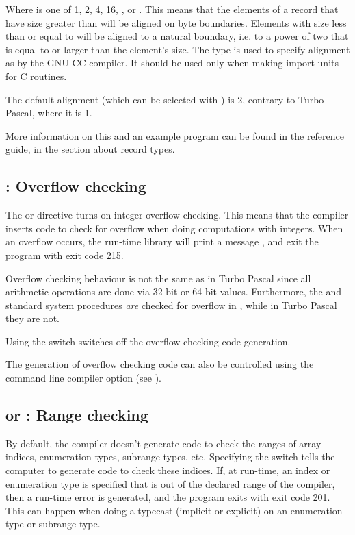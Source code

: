 Where  is one of 1, 2, 4, 16, ,  or .
This means that the elements of a record that have size greater than 
will be aligned on  byte boundaries. Elements with size less than or
equal to  will be aligned to a natural boundary, i.e. to a power of
two that is equal to or larger than the element's size. The type 
is used to specify alignment as by the GNU CC compiler. It should be used
only when making import units for C routines.

The default alignment (which can be selected with ) is 2,
contrary to Turbo Pascal, where it is 1.

More information on this and an example program can be found in the reference
guide, in the section about record types.


\subsection{ : Overflow checking}
The  or  directive turns on
integer overflow checking. This means that the compiler inserts code
to check for overflow when doing computations with integers.
When an overflow occurs, the run-time library will print a message
, and exit the program with exit code 215.

\begin{remark}Overflow checking behaviour is not the same as in
Turbo Pascal since all arithmetic operations are done via 32-bit or
64-bit values. Furthermore, the  and  standard system
procedures {\em are} checked for overflow in \fpc, while in Turbo
Pascal they are not.
\end{remark}
Using the  switch switches off the overflow checking code
generation.

The generation of overflow checking code can also be controlled
using the  command line compiler option (see \userref).

\subsection{ or  : Range checking}

By default, the compiler doesn't generate code to check the ranges of array
indices, enumeration types, subrange types, etc. Specifying the
 switch tells the computer to generate code to check these
indices. If, at run-time, an index or enumeration type is specified that is
out of the declared range of the compiler, then a run-time error is
generated, and the program exits with exit code 201. This can happen when
doing a typecast (implicit or explicit) on an enumeration type or subrange
type.

